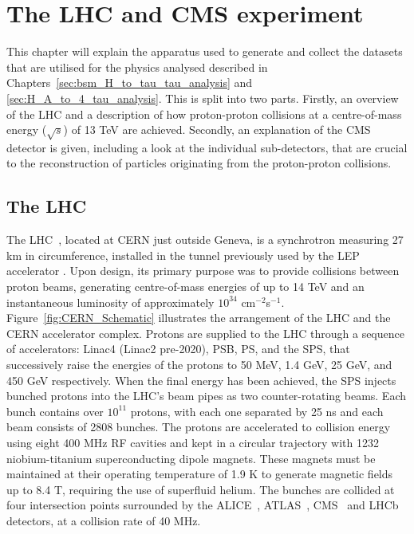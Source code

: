 \chapter{The LHC and CMS experiment}
\label{sec:cms}

This chapter will explain the apparatus used to generate and collect the datasets that are utilised for the physics analysed described in Chapters~\ref{sec:bsm_H_to_tau_tau_analysis} and \ref{sec:H_A_to_4_tau_analysis}.
This is split into two parts.
Firstly, an overview of the \ac{LHC} and a description of how proton-proton collisions at a centre-of-mass energy ($\sqrt{s}$) of 13 TeV are achieved.
Secondly, an explanation of the \ac{CMS} detector is given, including a look at the individual sub-detectors, that are crucial to the reconstruction of particles originating from the proton-proton collisions.

\section{The LHC}

The \ac{LHC}~\cite{Evans:2008zzb}, located at \ac{CERN} just outside Geneva, is a synchrotron measuring 27 km in circumference, installed in the tunnel previously used by the \ac{LEP} accelerator \cite{203828}. 
Upon design, its primary purpose was to provide collisions between proton beams, generating centre-of-mass energies of up to 14 TeV and an instantaneous luminosity of approximately $10^{34}$ cm$^{−2}$s$^{−1}$. 
Figure~\ref{fig:CERN_Schematic} illustrates the arrangement of the \ac{LHC} and the \ac{CERN} accelerator complex. 
Protons are supplied to the \ac{LHC} through a sequence of accelerators: Linac4 (Linac2 pre-2020), \ac{PSB}, \ac{PS}, and the \ac{SPS}, that successively raise the energies of the protons to 50 MeV, 1.4 GeV, 25 GeV, and 450 GeV respectively. 
When the final energy has been achieved, the \ac{SPS} injects bunched protons into the \ac{LHC}'s beam pipes as two counter-rotating beams. 
Each bunch contains over $10^{11}$ protons, with each one separated by 25 ns and each beam consists of 2808 bunches. 
The protons are accelerated to collision energy using eight 400 MHz \ac{RF} cavities and kept in a circular trajectory with 1232 niobium-titanium superconducting dipole magnets. 
These magnets must be maintained at their operating temperature of 1.9 K to generate magnetic fields up to 8.4 T, requiring the use of superfluid helium. 
The bunches are collided at four intersection points surrounded by the ALICE~\cite{ALICE:2008ngc}, ATLAS~\cite{ATLAS:2008xda}, CMS~\cite{CMS_Setup} and LHCb~\cite{LHCb:2008vvz} detectors, at a collision rate of 40 MHz. \\

